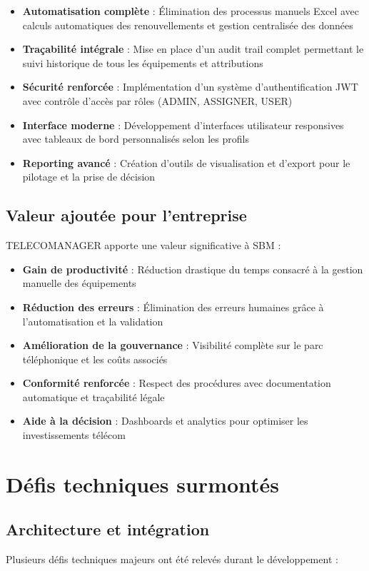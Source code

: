 \documentclass[12pt,a4paper]{report}
\begin{document}
\begin{itemize}
\item \textbf{Automatisation complète} : Élimination des processus manuels Excel avec calculs automatiques des renouvellements et gestion centralisée des données
\item \textbf{Traçabilité intégrale} : Mise en place d'un audit trail complet permettant le suivi historique de tous les équipements et attributions
\item \textbf{Sécurité renforcée} : Implémentation d'un système d'authentification JWT avec contrôle d'accès par rôles (ADMIN, ASSIGNER, USER)
\item \textbf{Interface moderne} : Développement d'interfaces utilisateur responsives avec tableaux de bord personnalisés selon les profils
\item \textbf{Reporting avancé} : Création d'outils de visualisation et d'export pour le pilotage et la prise de décision
\end{itemize}

\subsection{Valeur ajoutée pour l'entreprise}
TELECOMANAGER apporte une valeur significative à SBM :

\begin{itemize}
\item \textbf{Gain de productivité} : Réduction drastique du temps consacré à la gestion manuelle des équipements
\item \textbf{Réduction des erreurs} : Élimination des erreurs humaines grâce à l'automatisation et la validation
\item \textbf{Amélioration de la gouvernance} : Visibilité complète sur le parc téléphonique et les coûts associés
\item \textbf{Conformité renforcée} : Respect des procédures avec documentation automatique et traçabilité légale
\item \textbf{Aide à la décision} : Dashboards et analytics pour optimiser les investissements télécom
\end{itemize}

\section{Défis techniques surmontés}

\subsection{Architecture et intégration}
Plusieurs défis techniques majeurs ont été relevés durant le développement :
\end{document}
